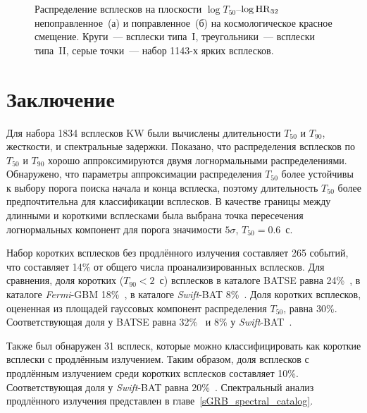 \begin{figure}[h]
  \begin{minipage}[h]{0.5\textwidth}
  \end{minipage}
  \hfill
  \begin{minipage}[h]{0.5\textwidth}
  \end{minipage}
  \caption{Распределение всплесков на плоскости $\log T_{50}$--$\log {\mathrm{HR}}_{32}$ 
  непоправленное~(а) и поправленное~(б) на космологическое красное смещение. 
  Круги~--- всплески типа~I, треугольники~--- всплески типа~II, 
  серые точки~--- набор 1143-х ярких всплесков.
  }
  \label{img:T50HRzCorr}  
\end{figure}

\section{Заключение} \label{sec:Conclision}
Для набора 1834 всплесков KW были вычислены длительности $T_{50}$ и $T_{90}$, жесткости, 
и спектральные задержки. Показано, что распределения 
всплесков по $T_{50}$ и $T_{90}$ хорошо аппроксимируются двумя логнормальными 
распределениями. Обнаружено, что параметры аппроксимации распределения $T_{50}$ 
более устойчивы к выбору порога поиска начала и конца всплеска, поэтому длительность 
$T_{50}$ более предпочтительна для классификации всплесков. В качестве границы между 
длинными и короткими всплесками была выбрана точка пересечения логнормальных компонент 
для порога значимости $5\sigma$, $T_{50} = 0.6$~с. 

Набор коротких всплесков без продлённого излучения составляет 265 событий, 
что составляет 14\% от общего числа проанализированных всплесков. Для сравнения, 
доля коротких ($T_{90}<2$~с) всплесков в каталоге BATSE равна 24\%~\citep{Meegan_2001}, %
в каталоге \textit{Fermi}-GBM 18\%~\citep{Paciesas_2012}, 
в каталоге \textit{Swift}-BAT 8\%~\citep{Sakamoto_2011ApJS}. 
Доля коротких всплесков, оцененная из площадей гауссовых компонент 
распределения $T_{50}$, равна 30\%. Соответствующая доля у BATSE равна 32\%~\citep{Horvath_2002} 
и 8\% у \textit{Swift}-BAT~\citep{Horvath_2008}.  

Также был обнаружен 31 всплеск, которые можно классифицировать как короткие 
всплески с продлённым излучением. Таким образом, доля всплесков с продлённым 
излучением среди коротких всплесков составляет 10\%. Соответствующая доля 
у \textit{Swift}-BAT равна 20\%~\citep{Sakamoto_2011ApJS}. 
Спектральный анализ продлённого излучения представлен в главе~\ref{sGRB_spectral_catalog}.

